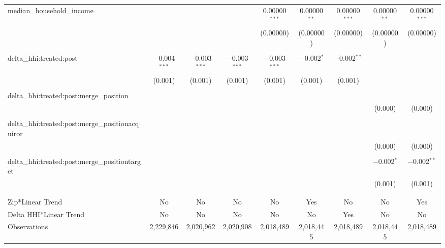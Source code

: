 \begin{table}[H]
{\begin{tabular}{@{\extracolsep{5pt}}lcccccccc}
  median\_household\_income &  &  &  & 0.00000$^{***}$ & 0.00000$^{**}$ & 0.00000$^{***}$ & 0.00000$^{**}$ & 0.00000$^{***}$ \\  

   &  &  &  & (0.00000) & (0.00000) & (0.00000) & (0.00000) & (0.00000) \\  

   & & & & & & & & \\  

  delta\_hhi:treated:post & $-$0.004$^{***}$ & $-$0.003$^{***}$ & $-$0.003$^{***}$ & $-$0.003$^{***}$ & $-$0.002$^{*}$ & $-$0.002$^{**}$ &  &  \\  

   & (0.001) & (0.001) & (0.001) & (0.001) & (0.001) & (0.001) &  &  \\  

   & & & & & & & & \\  

  delta\_hhi:treated:post:merge\_position &  &  &  &  &  &  &  &  \\  

   &  &  &  &  &  &  & (0.000) & (0.000) \\  

   & & & & & & & & \\  

  delta\_hhi:treated:post:merge\_positionacquiror &  &  &  &  &  &  &  &  \\  

   &  &  &  &  &  &  & (0.000) & (0.000) \\  

   & & & & & & & & \\  

  delta\_hhi:treated:post:merge\_positiontarget &  &  &  &  &  &  & $-$0.002$^{*}$ & $-$0.002$^{**}$ \\  

   &  &  &  &  &  &  & (0.001) & (0.001) \\  

   & & & & & & & & \\  

 \hline \\[-1.8ex]  

 Zip*Linear Trend & No & No & No & No & Yes & No & No & Yes \\  

 Delta HHI*Linear Trend & No & No & No & No & No & Yes & No & No \\  

 Observations & 2,229,846 & 2,020,962 & 2,020,908 & 2,018,489 & 2,018,445 & 2,018,489 & 2,018,445 & 2,018,489 \\  


\end{tabular}}
\end{table}
